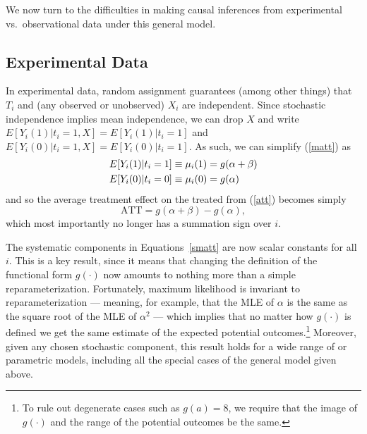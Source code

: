 \documentclass[11pt,titlepage]{article}
\begin{document}
We now turn to the difficulties in making causal inferences from
experimental vs.\ observational data under this general model.

\subsection{Experimental Data}\label{s:paraexp}

In experimental data, random assignment guarantees (among other
things) that $T_i$ and (any observed or unobserved) $X_i$ are
independent.  Since stochastic independence implies mean independence,
we can drop $X$ and write $E[Y_i(1)|t_i=1,X]=E[Y_i(1)|t_i=1]$ and
$E[Y_i(0)|t_i=1,X]=E[Y_i(0)|t_i=1]$.  As such, we can simplify
(\ref{matt}) as
\begin{align}
  \label{smatt}
  E[Y_i(1)|t_i=1] &\equiv \mu_i(1) = g(\alpha + \beta)\notag \\
  E[Y_i(0)|t_i=0] &\equiv \mu_i(0) = g(\alpha)
\end{align}
and so the average treatment effect on the treated from (\ref{att})
becomes simply
\begin{equation}
  \label{satt}
  \text{ATT} = g(\alpha+\beta) - g(\alpha),
\end{equation}
which most importantly no longer has a summation sign over $i$.

The systematic components in Equations~\ref{smatt} are now scalar
constants for all $i$.  This is a key result, since it means that
changing the definition of the functional form $g(\cdot)$ now amounts
to nothing more than a simple reparameterization.  Fortunately,
maximum likelihood is invariant to reparameterization --- meaning, for
example, that the MLE of $\alpha$ is the same as the square root of
the MLE of $\alpha^2$ \citep[][p.75--76]{King89} --- which implies
that no matter how $g(\cdot)$ is defined we get the same estimate of
the expected potential outcomes.\footnote{To rule out degenerate cases
  such as $g(a)=8$, we require that the image of $g(\cdot)$ and the
  range of the potential outcomes be the same.} Moreover, given any
chosen stochastic component, this result holds for a wide range of or
parametric models, including all the special cases of the general
model given above.
\end{document}
